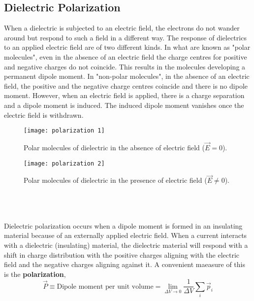 \subsection{Dielectric Polarization} 
When a dielectric is subjected to an electric field, the electrons do not wander around but respond to such a field in a different way. 
The response of dielectrics to an applied electric field are of two different kinds. In what are known as "polar molecules", even in the absence of an electric field the charge centres for positive and negative charges do not coincide. This results in the molecules developing a permanent dipole moment. In "non-polar molecules", in the absence of an electric field, the positive and the negative charge centres coincide and there is no dipole moment. However, when an electric field is applied, there is a charge separation and a dipole moment is induced. The induced dipole moment vanishes once the electric field is withdrawn.

\begin{minipage}{0.45\textwidth}
	\begin{figure}[H]
		\centering
		\texttt{[image: polarization 1]}
		\caption{Polar molecules of dielectric in the absence of electric field ($\vec{E}=0$).}
		\label{}
	\end{figure}
\end{minipage}\hfil
\begin{minipage}{0.45\textwidth}
	\begin{figure}[H]
		\centering
		\texttt{[image: polarization 2]}
		\caption{Polar molecules of dielectric in the presence of electric field ($\vec{E}\neq 0$).}
		\label{}
	\end{figure}
\end{minipage}
\\\\\\Dielectric polarization occurs when a dipole moment is formed in an insulating material because of an externally applied electric field. When a current interacts with a dielectric (insulating) material, the dielectric material will respond with a shift in charge distribution with the positive charges aligning with the electric field and the negative charges aligning against it. A convenient maeasure of this is the \textbf{polarization},
$$\vec{ P} \equiv \text{Dipole moment per unit volume}=\lim _{\Delta V \rightarrow 0} \frac{1}{\Delta V} \sum_{i} \vec{p}_{i}$$
